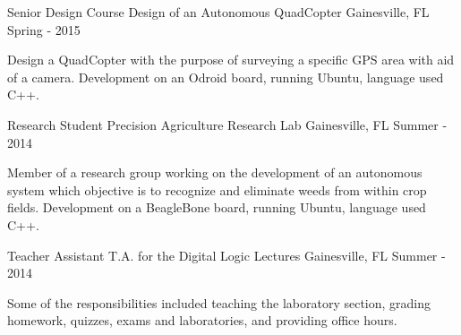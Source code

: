 

\begin{cventries}

  \cventry
    {Senior Design Course} %
    {Design of an Autonomous QuadCopter} %
    {Gainesville, FL} %
    {Spring - 2015} %
    {
      \begin{cvitems} %
				\item {Design a QuadCopter with the purpose of surveying a specific GPS area with aid of a camera. Development
					on an Odroid board, running Ubuntu, language used C++.}
      \end{cvitems}
    }

	\cventry
		{Research Student} %
		{Precision Agriculture Research Lab} %
		{Gainesville, FL} %
		{Summer - 2014} %
		{
			\begin{cvitems} %
			\item {Member of a research group working on the development of an autonomous system which 
				objective is to recognize and eliminate weeds from within crop fields. Development on a BeagleBone board,
					running Ubuntu, language used C++.}
			\end{cvitems}
		}

	\cventry
		{Teacher Assistant} %
		{T.A. for the Digital Logic Lectures} %
		{Gainesville, FL} %
		{Summer - 2014} %
		{
			\begin{cvitems} %
			\item {Some of the responsibilities included teaching the laboratory section, grading homework, quizzes, exams and
				laboratories, and providing office hours.}
			\end{cvitems}
		}


\end{cventries}
